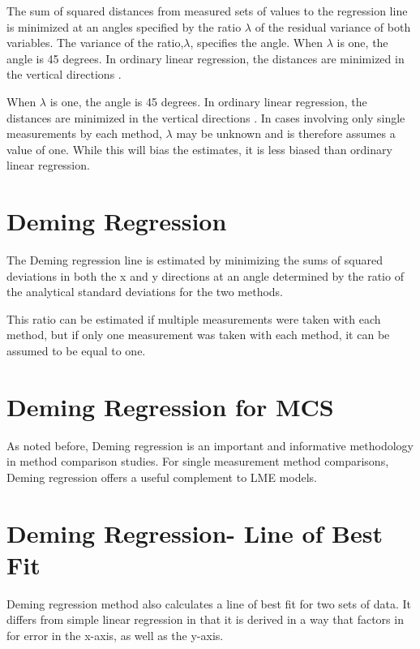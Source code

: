 \documentclass[12pt, a4paper]{report}
\theoremstyle{plain}
\theoremstyle{definition}
\theoremstyle{remark}
\begin{document}
The sum of squared distances from measured sets of values to the regression line is minimized at an angles specified by the ratio $\lambda$ of the residual variance of both variables. The variance of the ratio,$\lambda$, specifies the angle.  When $\lambda$ is one, the angle is 45 degrees. In ordinary linear regression, the distances are minimized in the vertical directions \citep{linnet99}.




When $\lambda$ is one, the angle is 45 degrees. In ordinary linear regression, the distances are minimized in the vertical directions \citep{linnet99}.
In cases involving only single measurements by each method, $\lambda$ may be unknown and is therefore assumes a value of one. While this will bias the estimates, it is less biased than ordinary linear regression.


\section{Deming Regression}

The Deming regression line is estimated by minimizing the sums of squared deviations in both the x and y directions at an angle determined by the ratio of the analytical standard deviations for the two methods.

This ratio can be estimated if multiple measurements were taken with each method, but if only one measurement was taken with each method, it can be assumed to be equal to one.


\section{Deming Regression for MCS}
As noted before, Deming regression is an important and informative methodology in method comparison studies.
For single measurement method comparisons, Deming regression offers a useful complement to LME models.

\section{Deming Regression- Line of Best Fit}


Deming regression method also calculates a line of best fit for two sets of data. It differs from simple linear regression in that it is derived in a way that factors in for error in the x-axis, as
well as the y-axis.
\end{document}
